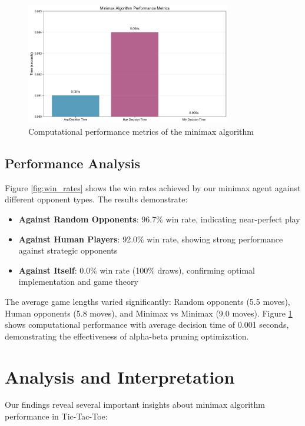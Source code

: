 \documentclass[12pt]{article}
\begin{document}
\begin{figure}[H]
\centering
\includegraphics[width=0.8\textwidth]{performance_metrics.png}
\caption{Computational performance metrics of the minimax algorithm}
\label{fig:performance_metrics}
\end{figure}

\subsection{Performance Analysis}

Figure \ref{fig:win_rates} shows the win rates achieved by our minimax agent against different opponent types. The results demonstrate:

\begin{itemize}
    \item \textbf{Against Random Opponents}: 96.7\% win rate, indicating near-perfect play
    \item \textbf{Against Human Players}: 92.0\% win rate, showing strong performance against strategic opponents
    \item \textbf{Against Itself}: 0.0\% win rate (100\% draws), confirming optimal implementation and game theory
\end{itemize}

The average game lengths varied significantly: Random opponents (5.5 moves), Human opponents (5.8 moves), and Minimax vs Minimax (9.0 moves). Figure \ref{fig:performance_metrics} shows computational performance with average decision time of 0.001 seconds, demonstrating the effectiveness of alpha-beta pruning optimization.

\section{Analysis and Interpretation}

Our findings reveal several important insights about minimax algorithm performance in Tic-Tac-Toe:
\end{document}
